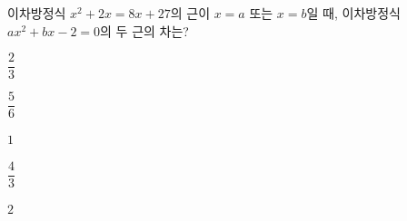 이차방정식 $x^2+2x=8x+27$의 근이 $x=a$ 또는 $x=b$일 때, 이차방정식 $ax^2+bx-2=0$의 두 근의 차는? 
\begin{choices32}{\rule[-3ex]{0pt}{8ex}$\dfrac{2}{3}$}{\rule[-3ex]{0pt}{8ex}$\dfrac{5}{6}$}{\rule[-3ex]{0pt}{8ex}$1$}{\rule[-3ex]{0pt}{8ex}$\dfrac{4}{3}$}{\rule[-3ex]{0pt}{8ex}$2$}\end{choices32}
